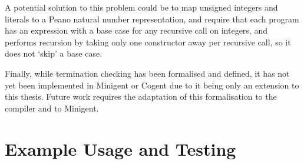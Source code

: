 A potential solution to this problem could be to map unsigned integers
and literals to a Peano natural number representation, and require that
each program has an expression with a base case for any recursive call
on integers, and performs recursion by taking only one constructor
away per recursive call, so it does not `skip' a base case.

Finally, while termination checking has been formalised and defined,
it has not yet been implemented in Minigent or Cogent due to it being
only an extension to this thesis. Future work requires the adaptation
of this formalisation to the compiler and to Minigent.


\section{Example Usage and Testing}
\label{ch:examplesandtesting}

